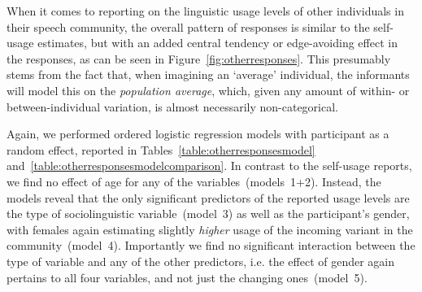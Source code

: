 When it comes to reporting on the linguistic usage levels of other individuals in their speech community, the overall pattern of responses is similar to the self-usage estimates, but with an added central tendency or edge-avoiding effect in the responses, as can be seen in Figure~\ref{fig:otherresponses}. This presumably stems from the fact that, when imagining an `average' individual, the informants will model this on the \emph{population average}, which, given any amount of within- or between-individual variation, is almost necessarily non-categorical.

Again, we performed ordered logistic regression models with participant as a random effect, reported in Tables~\ref{table:otherresponsesmodel} and~\ref{table:otherresponsesmodelcomparison}.
In contrast to the self-usage reports, we find no effect of age for any of the variables~(models~1+2). Instead, the models reveal that the only significant predictors of the reported usage levels are the type of sociolinguistic variable~(model~3) as well as the participant's gender, with females again estimating slightly \emph{higher} usage of the incoming variant in the community~(model~4). Importantly we find no significant interaction between the type of variable and any of the other predictors, i.e. the effect of gender again pertains to all four variables, and not just the changing ones~(model~5).


